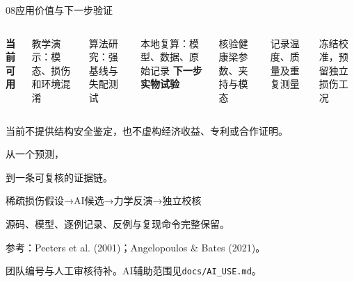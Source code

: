 \documentclass[UTF8,aspectratio=169,11pt,fontset=fandol]{ctexbeamer}
\begin{document}
\begin{frame}{08\quad 应用价值与下一步验证}
\begin{columns}[T]\vspace{4mm}\textbf{当前可用}\par\vspace{5mm}\small
教学演示：模态、损伤和环境混淆\par\vspace{3mm}
算法研究：强基线与失配测试\par\vspace{3mm}
本地复算：模型、数据、原始记录
\vspace{4mm}\textbf{下一步实物试验}\par\vspace{5mm}\small
核验健康梁参数、夹持与模态\par\vspace{3mm}
记录温度、质量及重复测量\par\vspace{3mm}
冻结校准，预留独立损伤工况
\end{columns}\vspace{9mm}\color{ochre}当前不提供结构安全鉴定，也不虚构经济收益、专利或合作证明。
\end{frame}
{
\begin{frame}[plain]\par\vspace{10mm}
{\fontsize{29}{38}\selectfont 从一个预测，\par 到一条可复核的证据链。}\par\vspace{9mm}
\small 稀疏损伤假设\quad →\quad AI候选\quad →\quad 力学反演\quad →\quad 独立校核\par\vspace{10mm}
{\color{mint}源码、模型、逐例记录、反例与复现命令完整保留。}\par\vfill
\small 参考：Peeters et al. (2001)；Angelopoulos \& Bates (2021)。\par 团队编号与人工审核待补。AI辅助范围见\texttt{docs/AI\_USE.md}。\vspace{5mm}
\end{frame}}
\end{document}
